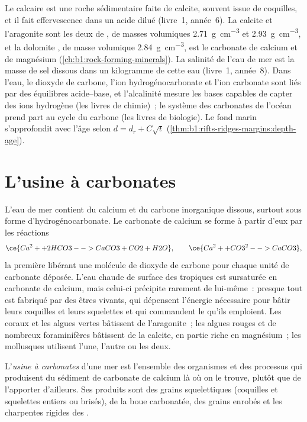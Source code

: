 \begin{recall}
Le calcaire est une roche sédimentaire faite de calcite, souvent issue de
coquilles, et il fait effervescence dans un acide dilué (livre~1, année~6). La
calcite et l'aragonite sont les deux  de , de masses
volumiques \qty{2.71}{g.cm^{-3}} et \qty{2.93}{g.cm^{-3}}, et la dolomite
, de masse volumique \qty{2.84}{g.cm^{-3}}, est le carbonate de
calcium et de magnésium (\cref{ch:b1:rock-forming-minerals}). La salinité de
l'eau de mer est la masse de sel dissous dans un kilogramme de cette eau
(livre~1, année~8). Dans l'eau, le dioxyde de carbone, l'ion hydrogénocarbonate
et l'ion carbonate sont liés par des équilibres acide--base, et l'alcalinité
mesure les bases capables de capter des ions hydrogène (les livres de chimie)~;
le système des carbonates de l'océan prend part au cycle du carbone (les livres
de biologie). Le fond marin s'approfondit avec l'âge selon $d = d_r + C\sqrt t$
(\cref{thm:b1:rifts-ridges-margins:depth-age}).
\end{recall}

\section{L'usine à carbonates}\label{sec:b1:chemical-biogenic-sediments:factory}

L'eau de mer contient du calcium et du carbone inorganique dissous, surtout sous forme
d'hydrogénocarbonate. Le carbonate de calcium se forme à partir d'eux par les réactions
\[
\ce{Ca^2+ + 2 HCO3- -> CaCO3 + CO2 + H2O}, \qquad
\ce{Ca^2+ + CO3^2- -> CaCO3},
\]
la première libérant une molécule de dioxyde de carbone pour chaque unité de carbonate
déposée. L'eau chaude de surface des tropiques est sursaturée en carbonate de
calcium, mais celui-ci précipite rarement de lui-même~: presque tout est fabriqué
par des êtres vivants, qui dépensent l'énergie nécessaire pour bâtir leurs
coquilles et leurs squelettes et qui commandent le  qu'ils emploient. Les
coraux et les algues vertes bâtissent de l'aragonite~; les algues rouges et de
nombreux foraminifères bâtissent de la calcite, en partie riche en magnésium~;
les mollusques utilisent l'une, l'autre ou les deux.

\begin{definition}\label{def:b1:chemical-biogenic-sediments:factory}
L'\emph{usine à carbonates} d'une mer est l'ensemble des
organismes et des processus qui produisent du sédiment de carbonate de calcium là où on le
trouve, plutôt que de l'apporter d'ailleurs. Ses produits sont des grains squelettiques
(coquilles et squelettes entiers ou brisés), de la boue carbonatée, des grains enrobés et les
charpentes rigides des .
\end{definition}

